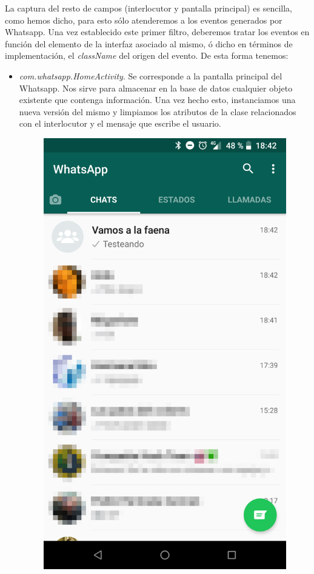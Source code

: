 \documentclass[12pt,a4paper,oneside]{book} %
\begin{document}
La captura del resto de campos (interlocutor y pantalla principal) es sencilla, como hemos dicho, para esto sólo atenderemos a los eventos generados por Whatsapp. Una vez establecido este primer filtro, deberemos tratar los eventos en función del elemento de la interfaz asociado al mismo, ó dicho en términos de implementación, el \textit{className} del origen del evento. De esta forma tenemos: 
\begin{itemize}
\item \textit{com.whatsapp.HomeActivity}. Se corresponde a la pantalla principal del Whatsapp. Nos sirve para almacenar en la base de datos cualquier objeto existente que contenga información. Una vez hecho esto, instanciamos una nueva versión del mismo y limpiamos los atributos de la clase relacionados con el interlocutor y el mensaje que escribe el usuario. 
\begin{figure}[H]
	\begin{center}
     	\includegraphics[scale=0.15]{pictures/IRL/whatsapp/whatsapp_home.png}

\end{center}
\end{figure}
\end{itemize}
\end{document}
